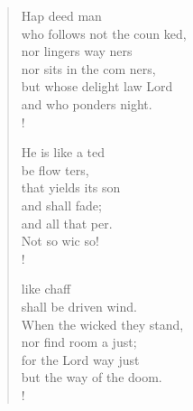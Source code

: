 \documentclass[10pt,a5paper,twoside]{report}
\begin{document}
\begin{flushleft}
\begin{verse}
 Hap deed   man\\
who follows not the coun   ked,\\
nor lingers   way  ners\\
nor sits in the com  ners,\\
 but whose delight   law   Lord\\
and who ponders     night.\\!

 He is like a    ted\\
be  flow ters,\\
that yields its    son\\
and   shall  fade;\\
and all that    per.\\
 Not so   wic  so!\\!

  like  chaff\\
shall be driven    wind.\\
 When the wicked   they   stand,\\
nor find room a    just;\\
 for the Lord   way   just\\
but the way of the    doom.\\!

\end{verse}
\end{flushleft}
\end{document}
